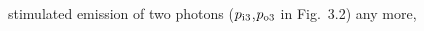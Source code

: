 \hsize=17cm
\parindent=0pt
\nopagenumbers
stimulated emission of two photons ($p_{\rm i3}$,$p_{\rm o3}$
in Fig.~3.2) any more,

\bye
